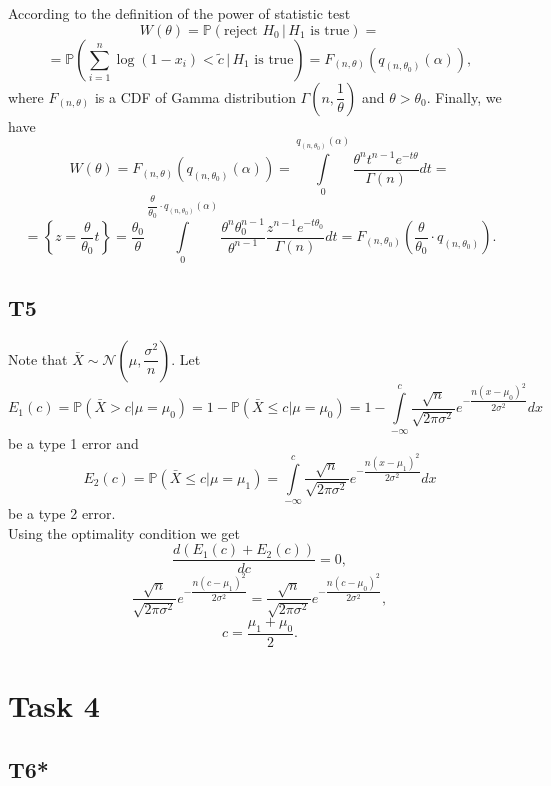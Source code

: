 \documentclass[a4paper, 12pt]{article}
\renewcommand*{\P}{\mathbb{P}}
\begin{document}
According to the definition of the power of statistic test
$$
W(\theta) = \P (\text{reject } H_0 \, | \, H_1 \text{ is true}) = 
$$
$$
= \P \left( \sum \limits_{i=1}^n \log (1 - x_i) < \widetilde{c} \, | \, H_1 \text{ is true} \right) = F_{(n, \theta)}(q_{(n, \theta_0)}(\alpha)),
$$
where $F_{(n, \theta)}$ is a CDF of Gamma distribution $\Gamma \left( n, \dfrac{1}{\theta} \right)$ and $\theta > \theta_0.$
Finally, we have
$$
W(\theta) = F_{(n, \theta)}(q_{(n, \theta_0)}(\alpha)) = \int \limits_{0}^{q_{(n, \theta_0)}(\alpha)} \dfrac{\theta^n t^{n-1} e^{-t \theta}}{ \Gamma(n)} dt = 
$$
$$
= \left \{ z = \dfrac{\theta}{\theta_0} t \right \} = \dfrac{\theta_0}{\theta} \int \limits_{0}^{\dfrac{\theta}{\theta_0} \cdot q_{(n, \theta_0)}(\alpha)} \dfrac{\theta^n \theta_0^{n-1}}{\theta^{n-1}} \dfrac{z^{n-1} e^{-t \theta_0}}{\Gamma(n)} dt = F_{(n, \theta_0)} \left( \dfrac{\theta}{\theta_0} \cdot q_{(n, \theta_0)} \right).
$$

\subsection{T5}
Note that $\bar{X} \sim \mathcal{N} \left( \mu, \dfrac{\sigma^2}{n} \right).$
Let 
$$
E_1(c) = \P(\bar{X} > c | \mu = \mu_0) = 1- \P(\bar{X} \leqslant c | \mu = \mu_0) = 1- \int \limits_{-\infty}^{c} \dfrac{\sqrt{n}}{\sqrt{2 \pi \sigma^2}} e^{-\dfrac{n (x-\mu_0)^2}{2 \sigma^2}} dx
$$
be a type 1 error and 
$$
E_2(c) = \P(\bar{X} \leqslant c | \mu = \mu_1) = \int \limits_{-\infty}^{c} \dfrac{\sqrt{n}}{\sqrt{2 \pi \sigma^2}} e^{-\dfrac{n (x-\mu_1)^2}{2 \sigma^2}} dx
$$
be a type 2 error.\\
Using the optimality condition we get
$$
\dfrac{d (E_1(c) + E_2(c))}{dc} = 0,
$$ 
$$
 \dfrac{\sqrt{n}}{\sqrt{2 \pi \sigma^2}} e^{-\dfrac{n (c-\mu_1)^2}{2 \sigma^2}} =  \dfrac{\sqrt{n}}{\sqrt{2 \pi \sigma^2}} e^{-\dfrac{n (c-\mu_0)^2}{2 \sigma^2}},
$$
$$
c = \dfrac{\mu_1 + \mu_0}{2}.
$$
\section{Task 4}
\subsection{T6*}
\end{document}
